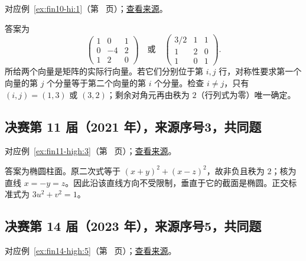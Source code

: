 \documentclass[UTF8,12pt,a4paper,fontset=fandol]{ctexart}
\begin{document}
对应例~\ref{ex:fin10-hi:1}（第~\pageref{ex:fin10-hi:1} 页）；\href{https://github.com/lzxcr/cmc-mathematics/blob/64916fa1fdbc3e444a652eca204d5669058ee321/src/problems/finals/10/01.md}{查看来源}。

\begin{solve}

答案为
\[
\begin{pmatrix}1&0&1\\0&-4&2\\1&2&0\end{pmatrix}\quad\text{或}\quad
\begin{pmatrix}3/2&1&1\\1&2&0\\1&0&1\end{pmatrix}.
\]
所给两个向量是矩阵的实际行向量。若它们分别位于第 $i,j$ 行，对称性要求第一个向量的第 $j$ 个分量等于第二个向量的第 $i$ 个分量。检查 $i\ne j$，只有 $(i,j)=(1,3)$ 或 $(3,2)$；剩余对角元再由秩为 $2$（行列式为零）唯一确定。

\end{solve}

\subsection{决赛第 11 届（2021 年），来源序号3，共同题}\label{ans:fin11-high:3}\label{pr:fin11-high:3}

对应例~\ref{ex:fin11-high:3}（第~\pageref{ex:fin11-high:3} 页）；\href{https://github.com/lzxcr/cmc-mathematics/blob/64916fa1fdbc3e444a652eca204d5669058ee321/src/problems/finals/11/03.md}{查看来源}。

\begin{solve}

答案为椭圆柱面。原二次式等于 $(x+y)^2+(x-z)^2$，故非负且秩为 $2$；核为直线 $x=-y=z$。因此沿该直线方向不受限制，垂直于它的截面是椭圆。正交标准式为 $3u^2+v^2=1$。

\end{solve}

\subsection{决赛第 14 届（2023 年），来源序号5，共同题}\label{ans:fin14-high:5}\label{pr:fin14-high:5}

对应例~\ref{ex:fin14-high:5}（第~\pageref{ex:fin14-high:5} 页）；\href{https://github.com/lzxcr/cmc-mathematics/blob/64916fa1fdbc3e444a652eca204d5669058ee321/src/problems/finals/14/05.md}{查看来源}。
\end{document}
